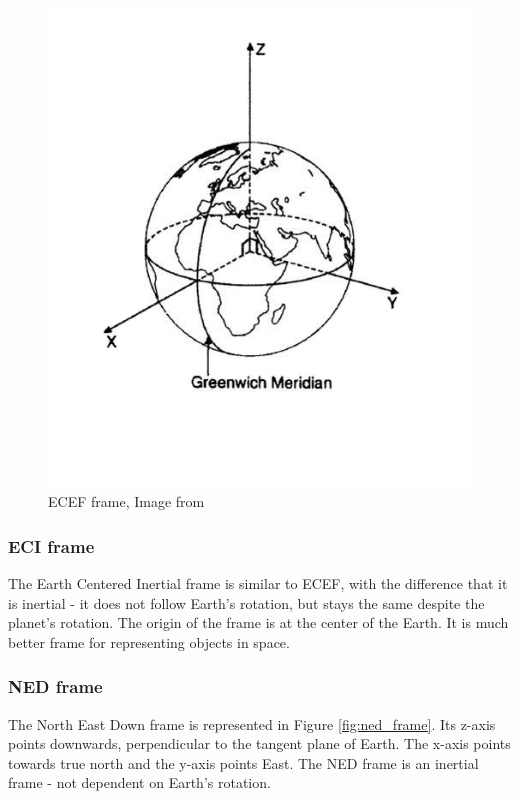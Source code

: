 \documentclass[12pt,a4paper,oneside]{article}
\begin{document}
\begin{figure}[!htb]
\includegraphics[scale=0.4]{eci_frame.jpg}
\centering
\caption{ECEF frame, Image from \citet{larson1992space}}
\label{fig:ecef_frame}
\end{figure}

\subsubsection{ECI frame}
The Earth Centered Inertial frame is similar to ECEF, with the difference that it is inertial - it does not follow Earth's rotation, but stays the same despite the planet's rotation. The origin of the frame is at the center of the Earth. It is much better frame for representing objects in space.
\citet{larson1992space}

\subsubsection{NED frame}
The North East Down frame is represented in Figure \ref{fig:ned_frame}. Its z-axis points downwards, perpendicular to the tangent plane of Earth. The x-axis points towards true north and the y-axis points East. The NED frame is an inertial frame - not dependent on Earth's rotation.
\end{document}
